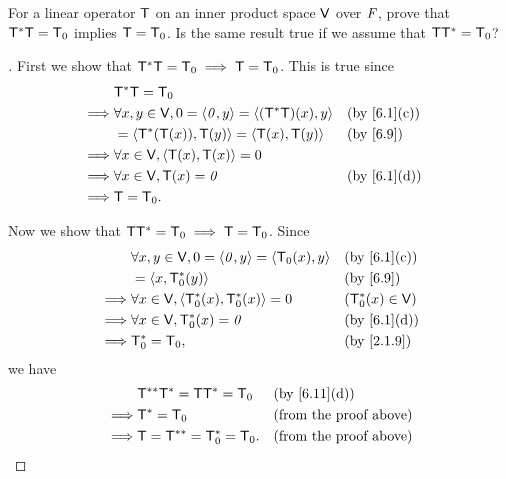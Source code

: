\begin{ex}\label{ex:6.3.11}
  For a linear operator \(\mathsf{T}\) on an inner product space \(\mathsf{V}\) over \(\mathit{F}\), prove that \(\mathsf{T}^* \mathsf{T} = \mathsf{T}_0\) implies \(\mathsf{T} = \mathsf{T}_0\).
  Is the same result true if we assume that \(\mathsf{T} \mathsf{T}^* = \mathsf{T}_0\)?
\end{ex}

\begin{proof}[]
  First we show that \(\mathsf{T}^* \mathsf{T} = \mathsf{T}_0 \implies \mathsf{T} = \mathsf{T}_0\).
  This is true since
  \begin{align*}
             & \T^* \T = \zT                                                                  \\
    \implies & \forall x, y \in \V, 0 = \inn{\zv, y} = \inn{(\T^* \T)(x), y} &  & \by{6.1}[c] \\
             & = \inn{\T^*(\T(x)), \T(y)} = \inn{\T(x), \T(y)}               &  & \by{6.9}    \\
    \implies & \forall x \in \V, \inn{\T(x), \T(x)} = 0                                       \\
    \implies & \forall x \in \V, \T(x) = \zv                                 &  & \by{6.1}[d] \\
    \implies & \T = \zT.
  \end{align*}

  Now we show that \(\mathsf{T} \mathsf{T}^* = \mathsf{T}_0 \implies \mathsf{T} = \mathsf{T}_0\).
  Since
  \begin{align*}
             & \forall x, y \in \V, 0 = \inn{\zv, y} = \inn{\zT(x), y} &  & \by{6.1}[c]       \\
             & = \inn{x, \zT^*(y)}                                     &  & \by{6.9}          \\
    \implies & \forall x \in \V, \inn{\zT^*(x), \zT^*(x)} = 0          &  & (\zT^*(x) \in \V) \\
    \implies & \forall x \in \V, \zT^*(x) = \zv                        &  & \by{6.1}[d]       \\
    \implies & \zT^* = \zT,                                            &  & \by{2.1.9}
  \end{align*}
  we have
  \begin{align*}
             & \T^{**} \T^* = \T \T^* = \zT &  & \by{6.11}[d]                  \\
    \implies & \T^* = \zT                   &  & \text{(from the proof above)} \\
    \implies & \T = \T^{**} = \zT^* = \zT.  &  & \text{(from the proof above)}
  \end{align*}
\end{proof}

